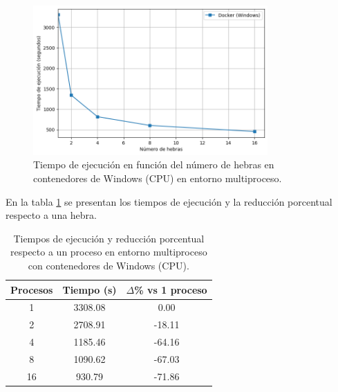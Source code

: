 \begin{figure}[ht]
    \centering
    \includegraphics[width=0.8\textwidth]{imagenes/cap5/multi-node_windows_docker_time.png}
    \caption{Tiempo de ejecución en función del número de hebras en contenedores de Windows (CPU) en entorno multiproceso.}
    \label{fig:multi-node_windows_docker_time}
\end{figure}

En la tabla \ref{tab:multi-node_windows_docker} se presentan los tiempos de ejecución y la reducción porcentual respecto a una hebra.

\begin{table}[ht]
    \centering
    \begin{tabular}{|c|c|c|}
        \hline
        \textbf{Procesos} & \textbf{Tiempo (s)} & \textbf{$\Delta$\% vs 1 proceso} \\
        \hline
        1                 & 3308.08             & 0.00                             \\
        2                 & 2708.91             & -18.11                           \\
        4                 & 1185.46             & -64.16                           \\
        8                 & 1090.62             & -67.03                           \\
        16                & 930.79              & -71.86                           \\
        \hline
    \end{tabular}
    \caption{Tiempos de ejecución y reducción porcentual respecto a un proceso en entorno multiproceso con contenedores de Windows (CPU).}
    \label{tab:multi-node_windows_docker}
\end{table}

